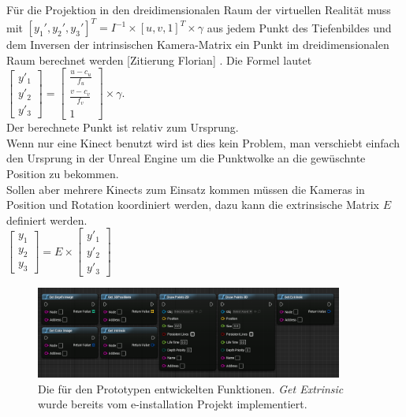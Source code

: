 \documentclass[a4paper]{IEEEtran}
\begin{document}
	Für die Projektion in den dreidimensionalen Raum der virtuellen Realität muss mit $[y_1',y_2',y_3']^T = I^{-1} \times [u,v,1]^T \times \gamma$ aus jedem Punkt des Tiefenbildes und dem Inversen der intrinsischen Kamera-Matrix ein Punkt im dreidimensionalen Raum berechnet werden [Zitierung Florian] \cite{ITM07_BrunnSawo}.
	Die Formel lautet \\[1cm]

$\begin{bmatrix}
y'_1 \\
y'_2 \\
y'_3
\end{bmatrix}
= \begin{bmatrix}
\frac{u - c_u}{f_u} \\
\frac{v - c_v}{f_v}  \\
1  
\end{bmatrix}
\times
\gamma$.\\[1cm]

	Der berechnete Punkt ist relativ zum Ursprung. \\
	Wenn nur eine Kinect benutzt wird ist dies kein Problem, man verschiebt einfach den Ursprung in der Unreal Engine um die Punktwolke an die gewüschnte Position zu bekommen. \\
	Sollen aber mehrere Kinects zum Einsatz kommen müssen die Kameras in Position und Rotation koordiniert werden, dazu kann die extrinsische Matrix $E$ definiert werden. \\[1cm]

$\begin{bmatrix}
y_1 \\
y_2 \\
y_3
\end{bmatrix}
= E
\times
\begin{bmatrix}
y'_1 \\
y'_2 \\
y'_3
\end{bmatrix}$\\[1cm]

	\begin{figure}[t]
    	\centering
		\includegraphics[width=0.9\textwidth]{img/AllFunctionsBP}
	    \caption{Die für den Prototypen entwickelten Funktionen. {\textit{Get Extrinsic}} wurde bereits vom e-installation Projekt implementiert.}
    	\label{AllFunctionsBP}
	\end{figure}
\end{document}
